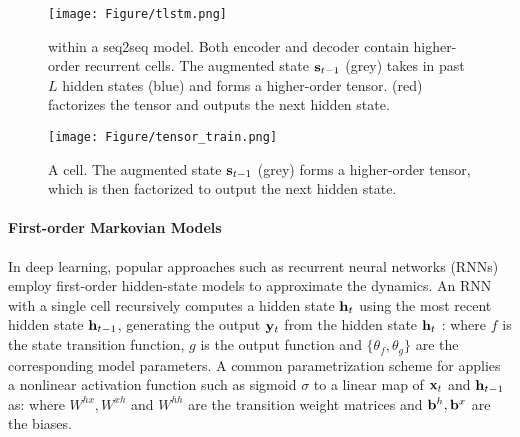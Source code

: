  
\begin{figure*}[t]
\begin{center}
\begin{minipage}[t]{0.62\linewidth}
\centering		\texttt{[image: Figure/tlstm.png]}
\caption{\trnn{} within a seq2seq model. Both encoder  and decoder contain higher-order recurrent cells. The augmented state ${\mathbf{s}}_{t-1}$ (grey) takes in past $L$ hidden states (blue) and forms a higher-order tensor. \trnn{} (red)  factorizes the tensor and outputs the next hidden state.}
\label{fig:seq2seq}
\end{minipage}
\hspace{0.02\linewidth}
\begin{minipage}[t]{0.33\linewidth}
\centering		\texttt{[image: Figure/tensor\_train.png]}
\caption{A \trnn{} cell. The augmented state ${\mathbf{s}}_{t-1}$ (grey) forms a higher-order tensor, which is then factorized to output the next hidden state.}
\label{fig:ttrnn}
\end{minipage}
\end{center}
\vspace{-5mm}
\end{figure*}

\paragraph{First-order Markovian Models}
%
In deep learning, popular approaches such as recurrent neural networks (RNNs) employ first-order hidden-state models to approximate the dynamics. An RNN with a single  cell recursively  computes a hidden state ${\mathbf{h}}_t$ using the most recent hidden state ${\mathbf{h}}_{t-1}$, generating  the output ${\mathbf{y}}_t$ from the hidden state ${\mathbf{h}}_t$ :
%
%
where $f$ is the state transition function, $g$ is the output  function and $\{\theta_f, \theta_g\}$ are the corresponding  model parameters. A common parametrization scheme for  applies a nonlinear  activation function such as sigmoid $\sigma$ to a linear map of ${\mathbf{x}}_t$ and ${\mathbf{h}}_{t-1}$ as:
%
where $W^{hx}, W^{xh}$ and $W^{hh}$ are  the transition weight matrices and ${\mathbf{b}}^h, {\mathbf{b}}^x$ are the biases.

